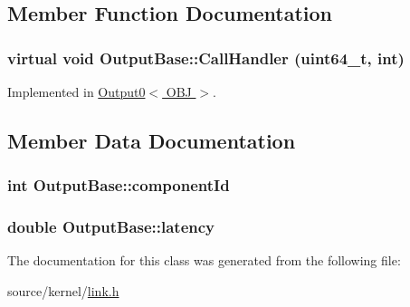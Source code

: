 \subsection{Member Function Documentation}
\hypertarget{classOutputBase_2d7b62cb9883958534b55b7bfa391394}{
\subsubsection[{CallHandler}]{\setlength{\rightskip}{0pt plus 5cm}virtual void OutputBase::CallHandler (uint64\_\-t, \/  int)}}
\label{classOutputBase_2d7b62cb9883958534b55b7bfa391394}




Implemented in \hyperlink{classOutput0_37e386a07fe2a033a847a39973458941}{Output0$<$ OBJ $>$}.

\subsection{Member Data Documentation}
\hypertarget{classOutputBase_93729601fb94bd561cb16ea2601d5528}{
\subsubsection[{componentId}]{\setlength{\rightskip}{0pt plus 5cm}int {\bf OutputBase::componentId}}}
\label{classOutputBase_93729601fb94bd561cb16ea2601d5528}


\hypertarget{classOutputBase_d2e8f2c3509a16cc1ae79f1f3f89ab27}{
\subsubsection[{latency}]{\setlength{\rightskip}{0pt plus 5cm}double {\bf OutputBase::latency}}}
\label{classOutputBase_d2e8f2c3509a16cc1ae79f1f3f89ab27}




The documentation for this class was generated from the following file:\begin{CompactItemize}
\item 
source/kernel/\hyperlink{link_8h}{link.h}\end{CompactItemize}
